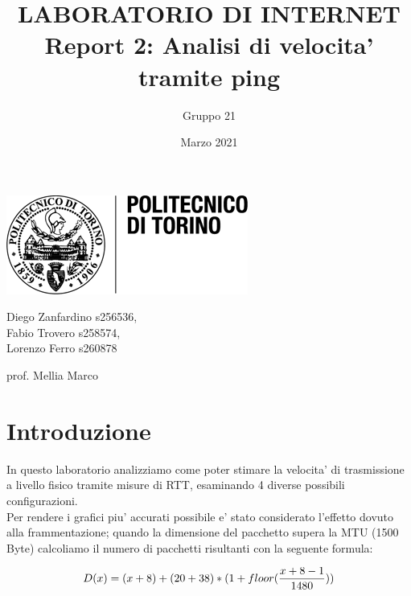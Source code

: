 \documentclass{article}
\title{\Huge LABORATORIO DI INTERNET 
    \\ Report 2: Analisi di velocita' \\ tramite ping}
\author{Gruppo 21}
\date{Marzo 2021}
\begin{document}
    \maketitle

    \begin{center}
        \includegraphics[scale=0.75]{logo_poli.png}

        \vspace{20mm}

        Diego Zanfardino s256536, \\
        Fabio Trovero s258574, \\
        Lorenzo Ferro s260878

        \vspace{10mm}
        prof. Mellia Marco
    \end{center}

    \pagebreak


    \section{Introduzione}

    In questo laboratorio analizziamo come poter stimare la velocita' di trasmissione a
    livello fisico tramite misure di RTT, esaminando 4 diverse possibili configurazioni. \\
    Per rendere i grafici piu' accurati possibile e' stato considerato l'effetto dovuto 
    alla frammentazione; quando la dimensione del pacchetto supera la MTU (1500 Byte) 
    calcoliamo il numero di pacchetti risultanti con la seguente formula:
    
    \begin{equation}
        \centering
        D(x) = (x + 8) + (20 + 38)*(1 + floor(\frac{x+8-1}{1480}))
    \end{equation}
    
\end{document}
